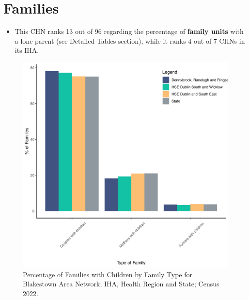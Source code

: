 \documentclass{article}
\begin{document}
\section{Families}\label{sect:Fam}
\begin{itemize}
\item This CHN ranks  13 out of 96 regarding the percentage of \textbf{family units} with a lone parent (see Detailed Tables section), while it ranks   4 out of 7 CHNs in its IHA.
\end{itemize}
\begin{figure}[H]
	\centering
	\includegraphics[width = 150mm]{../figures/FamED.pdf}
	\caption{Percentage of Families with Children by Family Type for Blakestown Area Network; IHA, Health Region and State; Census 2022.}
	\label{fig:vbnv}
	\end{figure}
	
\end{document}

